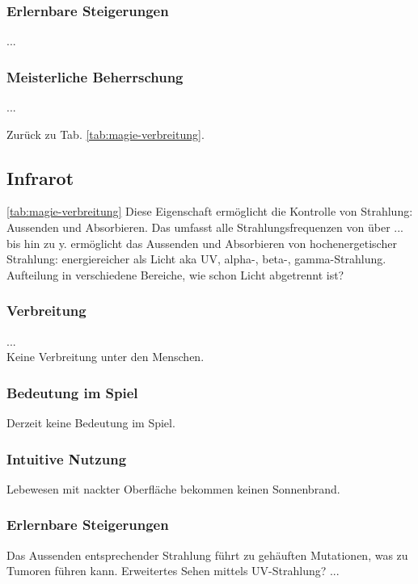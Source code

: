 \subsubsection{Erlernbare Steigerungen}
\begin{outline}
	\1 ...
\end{outline}

\subsubsection{Meisterliche Beherrschung} 
\begin{outline}
	\1 ...
\end{outline}
Zurück zu Tab. \ref{tab:magie-verbreitung}.



\subsection{Infrarot}\label{sec:infrarotmagie} \ref{tab:magie-verbreitung} %
Diese Eigenschaft ermöglicht die Kontrolle von Strahlung: Aussenden und Absorbieren. Das umfasst alle Strahlungsfrequenzen von  über ... bis hin zu y.
ermöglicht das Aussenden und Absorbieren von hochenergetischer Strahlung: energiereicher als Licht aka UV, alpha-, beta-, gamma-Strahlung. Aufteilung in verschiedene Bereiche, wie schon Licht abgetrennt ist? 

\subsubsection{Verbreitung}
...\\
Keine Verbreitung unter den Menschen.

\subsubsection{Bedeutung im Spiel}
Derzeit keine Bedeutung im Spiel.

\subsubsection{Intuitive Nutzung}
Lebewesen mit nackter Oberfläche bekommen keinen Sonnenbrand.

\subsubsection{Erlernbare Steigerungen}
\begin{outline}
	\1 Das Aussenden entsprechender Strahlung führt zu gehäuften Mutationen, was zu Tumoren führen kann.
	\1 Erweitertes Sehen mittels UV-Strahlung?
	\1 ...
\end{outline}

